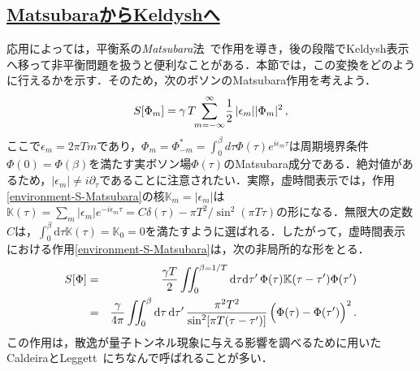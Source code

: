 \documentclass[a4paper,11pt]{ltjsarticle}
\newcommand{\subsectionlink}[1]{\subsection[#1]{\hyperlink{toc}{#1}}}
\def\d{\mathrm{d}}
\begin{document}
\subsectionlink{MatsubaraからKeldyshへ}\label{sec_environment-7}


応用によっては，平衡系の\emph{Matsubara}法~\cite{Matsubara:1955ws,AGD}で作用を導き，後の段階でKeldysh表示へ移って非平衡問題を扱うと便利なことがある．本節では，この変換をどのように行えるかを示す．そのため，次のボソンのMatsubara作用を考えよう．
\begin{equation}\label{environment-S-Matsubara}
S[\Phi_m]=\gamma\, T\!\! \sum\limits_{m=-\infty}^\infty\!{1\over
2}\,  |\epsilon_m||\Phi_m|^2\, ,
\end{equation}ここで$\epsilon_m=2\pi T m$であり，$\Phi_m=\Phi_{-m}^*=\int_0^{\beta}
d\tau \Phi(\tau) e^{i\epsilon_m \tau}$は周期境界条件$\Phi(0)=\Phi(\beta)$を満たす実ボソン場$\Phi(\tau)$のMatsubara成分である．絶対値があるため，$|\epsilon_m|\neq i\partial_\tau$であることに注意されたい．実際，虚時間表示では，作用\eqref{environment-S-Matsubara}の核$\mathbb{K}_{m}=|\epsilon_{m}|$は$\mathbb{K}(\tau)=\sum_{m}|\epsilon_m|e^{-i\epsilon_{m}\tau}=C\delta(\tau)-\pi
T^2/\sin^{2}(\pi T\tau)$の形になる．無限大の定数$C$は，$\int^{\beta}_{0}\d\tau\mathbb{K}(\tau)=\mathbb{K}_0=0$を満たすように選ばれる．したがって，虚時間表示における作用\eqref{environment-S-Matsubara}は，次の非局所的な形をとる．
\begin{eqnarray}\label{environment-S-CL}
S[\Phi]&=&\frac{\gamma
T}{2}\iint^{\beta=1/T}_{0}\d\tau\d\tau'\,\Phi(\tau)\mathbb{K}(\tau-\tau')\Phi(\tau')
\nonumber\\
&=&{\gamma\over 4\pi}\iint_{0}^{\beta} \d\tau\, \d\tau' \,
\frac{\pi^2 T^2}{\sin^2[\pi T(\tau-\tau')]}
\,\Big(\Phi(\tau)-\Phi(\tau')\Big)^2\, .
\end{eqnarray}この作用は，散逸が量子トンネル現象に与える影響を調べるために用いたCaldeiraとLeggett~\cite{Caldeira:1982uj}にちなんで呼ばれることが多い．
\end{document}

